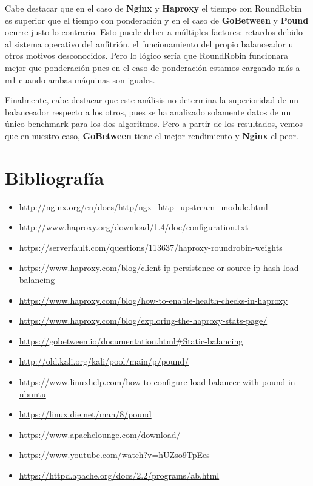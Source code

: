 \documentclass[twoside]{article}
\begin{document}
Cabe destacar que en el caso de \textbf{Nginx} y \textbf{Haproxy} el tiempo con RoundRobin es superior que el tiempo con ponderación y en el caso de \textbf{GoBetween} y \textbf{Pound} ocurre justo lo contrario. Esto puede deber a múltiples factores: retardos debido al sistema operativo del anfitrión, el funcionamiento del propio balanceador u otros motivos desconocidos. Pero lo lógico sería que RoundRobin funcionara mejor que ponderación pues en el caso de ponderación estamos cargando más a m1 cuando ambas máquinas son iguales.

Finalmente, cabe destacar que este análisis no determina la superioridad de un balanceador respecto a los otros, pues se ha analizado solamente datos de un único benchmark para los dos algoritmos. Pero a partir de los resultados, vemos que en nuestro caso, \textbf{GoBetween} tiene el mejor rendimiento y \textbf{Nginx} el peor.



\newpage
\section{Bibliografía}
\begin{itemize}
    \item \url{http://nginx.org/en/docs/http/ngx_http_upstream_module.html}
    \item \url{http://www.haproxy.org/download/1.4/doc/configuration.txt}
    \item \url{https://serverfault.com/questions/113637/haproxy-roundrobin-weights}
    \item \url{https://www.haproxy.com/blog/client-ip-persistence-or-source-ip-hash-load-balancing}
    \item \url{https://www.haproxy.com/blog/how-to-enable-health-checks-in-haproxy}
    \item \url{https://www.haproxy.com/blog/exploring-the-haproxy-stats-page/}
    \item \url{https://gobetween.io/documentation.html#Static-balancing}
    \item \url{http://old.kali.org/kali/pool/main/p/pound/}
    \item \url{https://www.linuxhelp.com/how-to-configure-load-balancer-with-pound-in-ubuntu}
    \item \url{https://linux.die.net/man/8/pound}
    \item \url{https://www.apachelounge.com/download/}
    \item \url{https://www.youtube.com/watch?v=hUZso9TpEes}
    \item \url{https://httpd.apache.org/docs/2.2/programs/ab.html}
\end{itemize}
\end{document}
